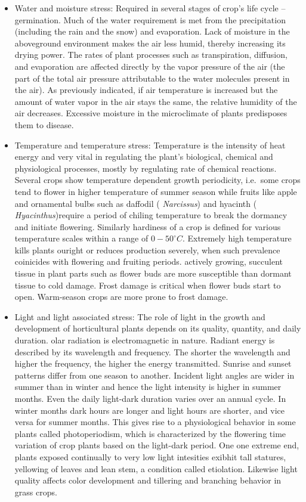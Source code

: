 \documentclass[
]{book}
\begin{document}
\begin{itemize}
\item
  Water and moisture stress: Required in several stages of crop's life cycle -- germination. Much of the water requirement is met from the precipitation (including the rain and the snow) and evaporation. Lack of moisture in the aboveground environment makes the air less humid, thereby increasing its drying power. The rates of plant processes such as transpiration, diffusion, and evaporation are affected directly by the vapor pressure of the air (the part of the total air pressure attributable to the water molecules present in the air). As previously indicated, if air temperature is increased but the amount of water vapor in the air stays the same, the relative humidity of the air decreases. Excessive moisture in the microclimate of plants predisposes them to disease.
\item
  Temperature and temperature stress: Temperature is the intensity of heat energy and very vital in regulating the plant's biological, chemical and physiological processes, mostly by regulating rate of chemical reactions. Several crops show temperature dependent growth periodicity, i.e.~some crops tend to flower in higher temperature of summer season while fruits like apple and ornamental bulbs such as daffodil ( \emph{Narcissus}) and hyacinth ( \emph{Hyacinthus})require a period of chiling temperature to break the dormancy and initiate flowering. Similarly hardiness of a crop is defined for various temperature scales within a range of \(0-50 ^\circ C\). Extremely high temperature kills plants ouright or reduces production severely, when such prevalence coinicides with flowering and fruiting periods. actively growing, succulent tissue in plant parts such as flower buds are more susceptible than dormant tissue to cold damage. Frost damage is critical when flower buds start to open. Warm-season crops are more prone to frost damage.
\item
  Light and light associated stress: The role of light in the growth and development of horticultural plants depends on its quality, quantity, and daily duration. olar radiation is electromagnetic in nature. Radiant energy is described by its wavelength and frequency. The shorter the wavelength and higher the frequency, the higher the energy transmitted. Sunrise and sunset patterns differ from one season to another. Incident light angles are wider in summer than in winter and hence the light intensity is higher in summer months. Even the daily light-dark duration varies over an annual cycle. In winter months dark hours are longer and light hours are shorter, and vice versa for summer months. This gives rise to a physiological behavior in some plants called photoperiodism, which is characterized by the flowering time variation of crop plants based on the light-dark period. One one extreme end, plants exposed continually to very low light intesities exibhit tall statures, yellowing of leaves and lean stem, a condition called etiolation. Likewise light quality affects color development and tillering and branching behavior in grass crops.
\end{itemize}
\end{document}

